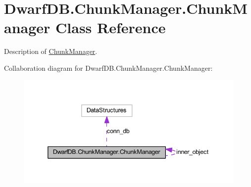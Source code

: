 \hypertarget{class_dwarf_d_b_1_1_chunk_manager_1_1_chunk_manager}{\section{Dwarf\+D\+B.\+Chunk\+Manager.\+Chunk\+Manager Class Reference}
\label{class_dwarf_d_b_1_1_chunk_manager_1_1_chunk_manager}
}


Description of \hyperlink{class_dwarf_d_b_1_1_chunk_manager_1_1_chunk_manager}{Chunk\+Manager}.  




Collaboration diagram for Dwarf\+D\+B.\+Chunk\+Manager.\+Chunk\+Manager\+:\nopagebreak
\begin{figure}[H]
\begin{center}
\leavevmode
\includegraphics[width=341pt]{class_dwarf_d_b_1_1_chunk_manager_1_1_chunk_manager__coll__graph}
\end{center}
\end{figure}
